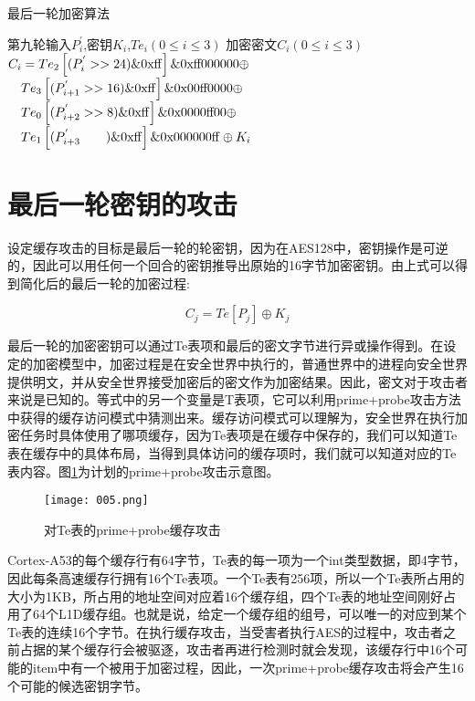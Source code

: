 \begin{breakablealgorithm}
	\caption{最后一轮加密算法}
	\begin{algorithmic}[1]
		\Require 第九轮输入$P_i^'$,密钥${K_i}$,$T{e_i}\left( {0 \le i \le 3} \right)$
		\Ensure 加密密文${C_i}\left( {0 \le i \le 3} \right)$
		\State$	{C_i} = T{e_2}\left[ {(P_i^{'} >  > 24)\& 0{\rm{xff}}} \right]\& 0{\rm{xff000000}} \oplus $
		\State	$\quad T{e_3}\left[ {(P_{i + 1}^{'} >  > 16)\& 0{\rm{xff}}} \right]\& 0{\rm{x00ff0000}} \oplus $
		\State	$\quad T{e_0}\left[ {(P_{i + 2}^{'} >  > 8)\& 0{\rm{xff}}} \right]\& 0{\rm{x0000ff00}} \oplus$
		\State 	$\quad T{e_1}\left[ {(P_{i + 3}^{'}\quad \quad )\& 0{\rm{xff}}} \right]\& 0{\rm{x000000ff}} \oplus {K_i}$
		\EndFor
		\State{}
		\EndFunction
	\end{algorithmic}
\end{breakablealgorithm}



\section{最后一轮密钥的攻击}
设定缓存攻击的目标是最后一轮的轮密钥，因为在AES128中，密钥操作是可逆的，因此可以用任何一个回合的密钥推导出原始的16字节加密密钥。由上式可以得到简化后的最后一轮的加密过程:


\begin{equation}
{C_j} = Te\left[ {{P_j}} \right] \oplus {K_j}
\end{equation}

最后一轮的加密密钥可以通过Te表项和最后的密文字节进行异或操作得到。在设定的加密模型中，加密过程是在安全世界中执行的，普通世界中的进程向安全世界提供明文，并从安全世界接受加密后的密文作为加密结果。因此，密文对于攻击者来说是已知的。等式中的另一个变量是T表项，它可以利用prime+probe攻击方法中获得的缓存访问模式中猜测出来。缓存访问模式可以理解为，安全世界在执行加密任务时具体使用了哪项缓存，因为Te表项是在缓存中保存的，我们可以知道Te表在缓存中的具体布局，当得到具体访问的缓存项时，我们就可以知道对应的Te表内容。图\ref{005}为计划的prime+probe攻击示意图。

\begin{figure}[H]
	\centering
	\texttt{[image: 005.png]}
	\caption{对Te表的prime+probe缓存攻击}
	\label{005}
\end{figure}

Cortex-A53的每个缓存行有64字节，Te表的每一项为一个int类型数据，即4字节，因此每条高速缓存行拥有16个Te表项。一个Te表有256项，所以一个Te表所占用的大小为1KB，所占用的地址空间对应着16个缓存组，四个Te表的地址空间刚好占用了64个L1D缓存组。也就是说，给定一个缓存组的组号，可以唯一的对应到某个Te表的连续16个字节。在执行缓存攻击，当受害者执行AES的过程中，攻击者之前占据的某个缓存行会被驱逐，攻击者再进行检测时就会发现，该缓存行中16个可能的item中有一个被用于加密过程，因此，一次prime+probe缓存攻击将会产生16个可能的候选密钥字节。

